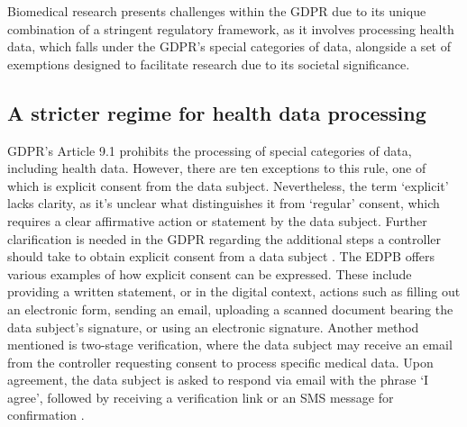 Biomedical research presents challenges within the GDPR due to its unique combination of a stringent regulatory framework, as it involves processing health data, which falls under the GDPR's special categories of data, alongside a set of exemptions designed to facilitate research due to its societal significance.

\subsection{A stricter regime for health data processing}
\label{sec:stricter_regime}

GDPR's Article 9.1 \citeyearpar{noauthor_regulation_2016} prohibits the processing of special categories of data, including health data.
However, there are ten exceptions to this rule, one of which is explicit consent from the data subject.
Nevertheless, the term `explicit' lacks clarity, as it's unclear what distinguishes it from `regular' consent, which requires a clear affirmative action or statement by the data subject.
Further clarification is needed in the GDPR regarding the additional steps a controller should take to obtain explicit consent from a data subject \citep{european_data_protection_board_guidelines_2020}.
The EDPB offers various examples of how explicit consent can be expressed.
These include providing a written statement, or in the digital context, actions such as filling out an electronic form, sending an email, uploading a scanned document bearing the data subject's signature, or using an electronic signature.
Another method mentioned is two-stage verification, where the data subject may receive an email from the controller requesting consent to process specific medical data.
Upon agreement, the data subject is asked to respond via email with the phrase `I agree', followed by receiving a verification link or an SMS message for confirmation \citep{european_data_protection_board_guidelines_2020}.

